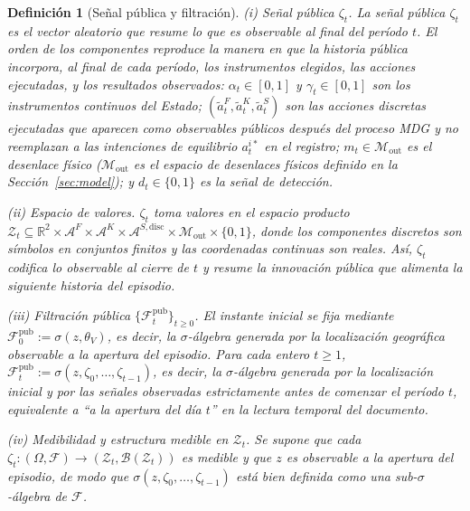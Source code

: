 \documentclass[pdflatex,sn-mathphys-ay]{sn-jnl}
\theoremstyle{thmstyleone}
\theoremstyle{thmstyletwo}
\theoremstyle{thmstylethree}
\newtheorem{definition}{Definición}
\newcommand{\1}{\mathbf{1}}
\begin{document}
\begin{definition}[Señal pública y filtración]
\label{def:zeta-filtration}
\noindent\textup{(i)} Señal pública $\zeta_t$.\quad
La señal pública $\zeta_t$ es el vector aleatorio que resume lo que es observable al final del período $t$. El orden de los componentes reproduce la manera en que la historia pública incorpora, al final de cada período, los instrumentos elegidos, las acciones ejecutadas, y los resultados observados:
 $\alpha_t\in[0,1]$ y $\gamma_t\in[0,1]$ son los instrumentos continuos del Estado; $(\tilde{a}_t^F,\tilde{a}_t^K,\tilde{a}_t^S)$ son las acciones discretas ejecutadas que aparecen como observables públicos después del proceso MDG y no reemplazan a las intenciones de equilibrio $a_t^{i\ast}$ en el registro; $m_t\in\mathcal{M}_{\mathrm{out}}$ es el desenlace físico \textup{(}$\mathcal{M}_{\mathrm{out}}$ es el espacio de desenlaces físicos definido en la Sección~\ref{sec:model}\textup{)}; y $d_t\in\{0,1\}$ es la señal de detección.

\medskip
\noindent\textup{(ii)} Espacio de valores.\quad
$\zeta_t$ toma valores en el espacio producto $\mathcal{Z}_t \subseteq \mathbb{R}^2 \times \mathcal{A}^F \times \mathcal{A}^K \times \mathcal{A}^{S,\mathrm{disc}} \times \mathcal{M}_{\mathrm{out}} \times \{0,1\}$, donde los componentes discretos son símbolos en conjuntos finitos y las coordenadas continuas son reales. Así, $\zeta_t$ codifica lo observable al cierre de $t$ y resume la innovación pública que alimenta la siguiente historia del episodio.

\medskip
\noindent\textup{(iii)} Filtración pública $\{\mathcal{F}_t^{\mathrm{pub}}\}_{t\ge 0}$.\quad
El instante inicial se fija mediante $\mathcal{F}_0^{\mathrm{pub}}:=\sigma(z, \theta_V)$, es decir, la $\sigma$-álgebra generada por la localización geográfica observable a la apertura del episodio. Para cada entero $t\ge 1$, $\mathcal{F}_t^{\mathrm{pub}}:=\sigma(z,\zeta_0,\ldots,\zeta_{t-1})$, es decir, la $\sigma$-álgebra generada por la localización inicial y por las señales observadas estrictamente antes de comenzar el período $t$, equivalente a ``a la apertura del día $t$'' en la lectura temporal del documento.

\smallskip
\noindent\textup{(iv)} Medibilidad y estructura medible en $\mathcal{Z}_t$.\quad
Se supone que cada $\zeta_t:(\Omega,\mathcal{F})\to(\mathcal{Z}_t,\mathcal{B}(\mathcal{Z}_t))$ es medible y que $z$ es observable a la apertura del episodio, de modo que $\sigma(z,\zeta_0,\ldots,\zeta_{t-1})$ está bien definida como una sub-$\sigma$-álgebra de $\mathcal{F}$.
\end{definition}
\end{document}
